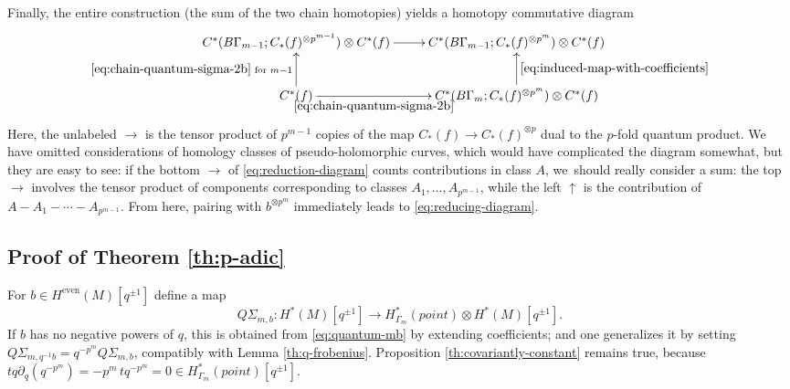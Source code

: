 \documentclass[10pt,a4paper]{amsart}
\theoremstyle{plain}
\theoremstyle{definition}
\begin{document}
Finally, the entire construction (the sum of the two chain homotopies) yields a homotopy commutative diagram
\begin{equation}\label{eq:reduction-diagram}
\begin{array}{c}
\xymatrix{
C^*(B\Gamma_{m-1}; C_*(f)^{\otimes p^{m-1}}) \otimes C^*(f) \ar[r]
&
C^*(B\Gamma_{m-1}; C_*(f)^{\otimes p^{m}}) \otimes C^*(f)
\\
C^*(f) \ar[u]^-{\eqref{eq:chain-quantum-sigma-2b} \text{ for } m-1}
\ar[r]_-{\eqref{eq:chain-quantum-sigma-2b}} &
C^*(B\Gamma_m;C_*(f)^{\otimes p^{m}}) \otimes C^*(f)
\ar[u]_-{\eqref{eq:induced-map-with-coefficients}}
}
\end{array}
\end{equation}
Here, the unlabeled $\to$ is the tensor product of $p^{m-1}$ copies of the map $C_*(f) \to C_*(f)^{\otimes p}$ dual to the $p$-fold quantum product. We have omitted considerations of homology classes of pseudo-holomorphic curves, which would have complicated the diagram somewhat, but they are easy to see: if the bottom $\to$ of \eqref{eq:reduction-diagram} counts contributions in class $A$, we~should really consider a sum: the top $\to$ involves the tensor product of components corresponding to classes $A_1,\dots,A_{p^{m-1}}$, while the left $\uparrow$ is the contribution of $A - A_1 - \cdots - A_{p^{m-1}}$. From here, pairing with $b^{\otimes p^m}$ immediately leads to \eqref{eq:reducing-diagram}.



\subsection{Proof of Theorem \ref{th:p-adic}}
For $b \in H^{\mathrm{even}}(M)[q^{\pm 1}]$ define a map
\begin{equation*}
Q\Sigma_{m,b}: H^*(M)[q^{\pm 1}] \to H^*_{\Gamma_m}(\mathit{point}) \otimes H^*(M)[q^{\pm 1}].
\end{equation*}
If $b$ has no negative powers of $q$, this is obtained from \eqref{eq:quantum-mb} by extending coefficients; and one generalizes it by setting $Q\Sigma_{m,q^{-1}b} = q^{-p^m} Q\Sigma_{m,b}$, compatibly with Lemma \ref{th:q-frobenius}. Proposition \ref{th:covariantly-constant} remains true, because $tq\partial_q (q^{-p^m}) = -p^m \,tq^{-p^m} = 0 \in H^*_{\Gamma_m}(\mathit{point})[q^{\pm 1}]$.
\end{document}

